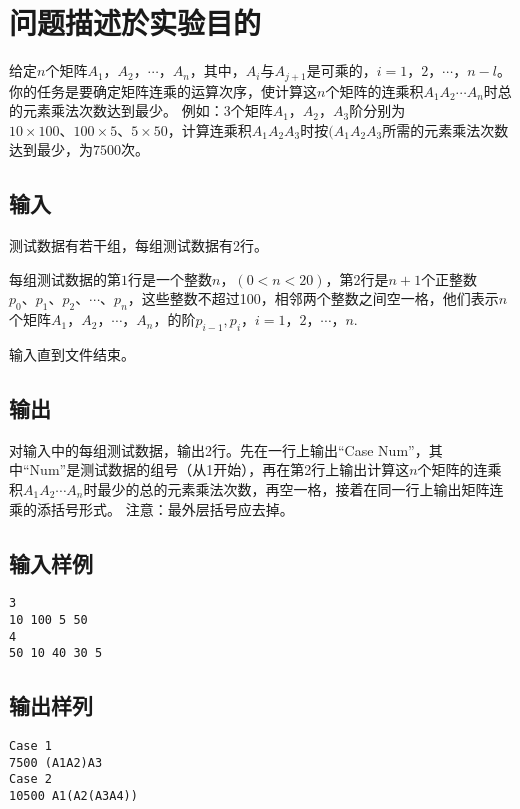 \documentclass{zjureport}
\begin{document}
\thispagestyle{empty}

\makeCover


\section{问题描述於实验目的}
给定$n$个矩阵$A_{1}，A_{2}，\cdots，A_n$，其中，$A_i$与$A_{j+1}$是可乘的，$i=1，2，\cdots，n-l$。
你的任务是要确定矩阵连乘的运算次序，使计算这$n$个矩阵的连乘积$A_{1}A_2\cdots A_n$时总的元素乘法次数达到最少。
例如：3个矩阵$A_1，A_2，A_3$阶分别为$10 \times 100、100 \times 5、5 \times 50$，计算连乘积$A_1A_2A_3$时按$(A_1 A_2 A_3$所需的元素乘法次数达到最少，为$7500$次。
\subsection{输入}
测试数据有若干组，每组测试数据有2行。\par
每组测试数据的第$1$行是一个整数$n$，$(0<n<20)$，第$2$行是$n+1$个正整数$p_0、p_1、p_2、\cdots、p_n$，这些整数不超过100，相邻两个整数之间空一格，他们表示$n$个矩阵$A_1，A_2，\cdots，A_n$，的阶$p_{i-1}, p_{i}，i=1，2，\cdots，n$.\par
输入直到文件结束。\par
\subsection{输出}
对输入中的每组测试数据，输出2行。先在一行上输出“Case Num”，其中“Num”是测试数据的组号（从1开始），再在第2行上输出计算这$n$个矩阵的连乘积$A_1 A_2 \cdots A_n$时最少的总的元素乘法次数，再空一格，接着在同一行上输出矩阵连乘的添括号形式。
注意：最外层括号应去掉。
\subsection{输入样例}
\begin{lstlisting}
3
10 100 5 50
4
50 10 40 30 5
\end{lstlisting}

\subsection{输出样列}
\begin{lstlisting}
Case 1
7500 (A1A2)A3
Case 2
10500 A1(A2(A3A4))
\end{lstlisting}
\end{document}
